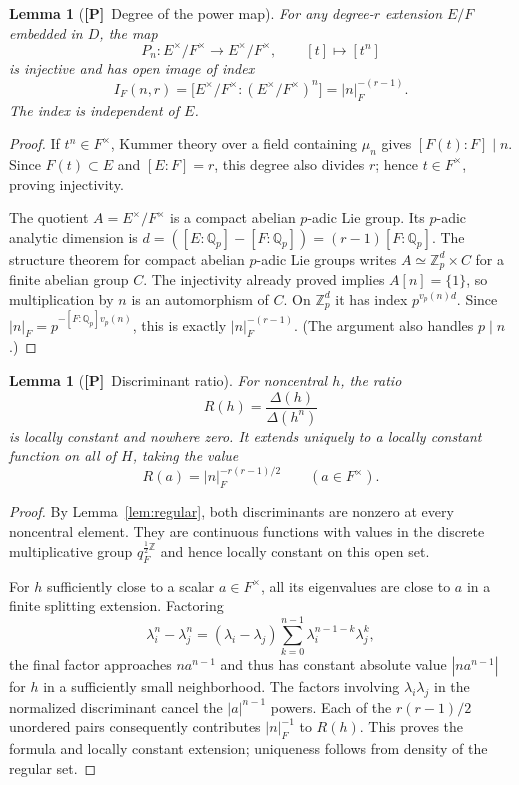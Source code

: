 \documentclass[11pt]{article}
\newcommand{\Ptag}{\textnormal{\textbf{[P]}}}
\theoremstyle{plain}
\newtheorem{lemma}[theorem]{Lemma}
\theoremstyle{definition}
\begin{document}
\begin{lemma}[\Ptag\ Degree of the power map]\label{lem:index}
For any degree-$r$ extension $E/F$ embedded in $D$, the map
\[
P_n:E^\times/F^\times\longrightarrow E^\times/F^\times,\qquad [t]\longmapsto[t^n]
\]
is injective and has open image of index
\begin{equation}\label{eq:index}
I_F(n,r)=\bigl[E^\times/F^\times:(E^\times/F^\times)^n\bigr]
=|n|_F^{-(r-1)}.
\end{equation}
The index is independent of $E$.
\end{lemma}
\begin{proof}
If $t^n\in F^\times$, Kummer theory over a field containing $\mu_n$ gives $[F(t):F]\mid n$. Since $F(t)\subset E$ and $[E:F]=r$, this degree also divides $r$; hence $t\in F^\times$, proving injectivity.

The quotient $A=E^\times/F^\times$ is a compact abelian $p$-adic Lie group. Its $p$-adic analytic dimension is $d=([E:\mathbb Q_p]-[F:\mathbb Q_p])=(r-1)[F:\mathbb Q_p]$. The structure theorem for compact abelian $p$-adic Lie groups writes $A\simeq \mathbb Z_p^d\times C$ for a finite abelian group $C$. The injectivity already proved implies $A[n]=\{1\}$, so multiplication by $n$ is an automorphism of $C$. On $\mathbb Z_p^d$ it has index $p^{v_p(n)d}$. Since $|n|_F=p^{-[F:\mathbb Q_p]v_p(n)}$, this is exactly $|n|_F^{-(r-1)}$. (The argument also handles $p\mid n$.)
\end{proof}

\begin{lemma}[\Ptag\ Discriminant ratio]\label{lem:ratio}
For noncentral $h$, the ratio
\[
R(h)=\frac{\Delta(h)}{\Delta(h^n)}
\]
is locally constant and nowhere zero. It extends uniquely to a locally constant function on all of $H$, taking the value
\begin{equation}\label{eq:ratio-at-center}
R(a)=|n|_F^{-r(r-1)/2}\qquad(a\in F^\times).
\end{equation}
\end{lemma}
\begin{proof}
By Lemma~\ref{lem:regular}, both discriminants are nonzero at every noncentral element. They are continuous functions with values in the discrete multiplicative group $q_F^{\frac12\mathbb Z}$ and hence locally constant on this open set.

For $h$ sufficiently close to a scalar $a\in F^\times$, all its eigenvalues are close to $a$ in a finite splitting extension. Factoring
\[
\lambda_i^n-\lambda_j^n=(\lambda_i-\lambda_j)
\sum_{k=0}^{n-1}\lambda_i^{n-1-k}\lambda_j^k,
\]
the final factor approaches $na^{n-1}$ and thus has constant absolute value $|na^{n-1}|$ for $h$ in a sufficiently small neighborhood. The factors involving $\lambda_i\lambda_j$ in the normalized discriminant cancel the $|a|^{n-1}$ powers. Each of the $r(r-1)/2$ unordered pairs consequently contributes $|n|_F^{-1}$ to $R(h)$. This proves the formula and locally constant extension; uniqueness follows from density of the regular set.
\end{proof}
\end{document}
